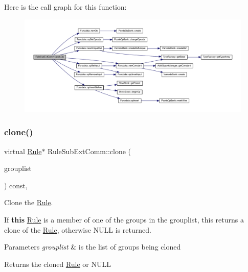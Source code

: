 Here is the call graph for this function\+:
\nopagebreak
\begin{figure}[H]
\begin{center}
\leavevmode
\includegraphics[width=350pt]{class_rule_sub_ext_comm_a3a2efa5df8447bd6c5423d5829a36de0_cgraph}
\end{center}
\end{figure}
\mbox{\label{class_rule_sub_ext_comm_ae11025cea865b30c65eb436fdb491f88}} 
\subsubsection{\texorpdfstring{clone()}{clone()}}
{\footnotesize\ttfamily virtual \mbox{\hyperlink{class_rule}{Rule}}$\ast$ Rule\+Sub\+Ext\+Comm\+::clone (\begin{DoxyParamCaption}\item[{const \mbox{\hyperlink{class_action_group_list}{Action\+Group\+List}} \&}]{grouplist }\end{DoxyParamCaption}) const\hspace{0.3cm}{\ttfamily [inline]}, {\ttfamily [virtual]}}



Clone the \mbox{\hyperlink{class_rule}{Rule}}. 

If {\bfseries{this}} \mbox{\hyperlink{class_rule}{Rule}} is a member of one of the groups in the grouplist, this returns a clone of the \mbox{\hyperlink{class_rule}{Rule}}, otherwise N\+U\+LL is returned. 
\begin{DoxyParams}{Parameters}
{\em grouplist} & is the list of groups being cloned \\
\hline
\end{DoxyParams}
\begin{DoxyReturn}{Returns}
the cloned \mbox{\hyperlink{class_rule}{Rule}} or N\+U\+LL 
\end{DoxyReturn}


